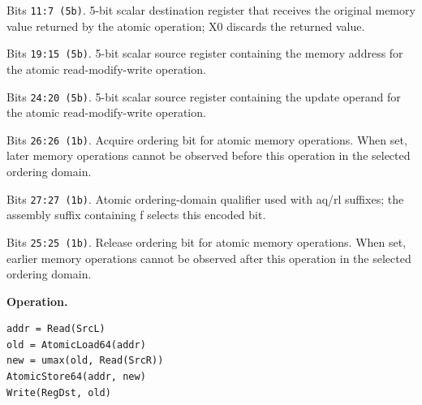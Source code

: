 \begin{description}[leftmargin=0.18\linewidth,style=nextline]
\item[\texttt{RegDst}] Bits \texttt{11:7 (5b)}. 5-bit scalar destination register that receives the original memory value returned by the atomic operation; X0 discards the returned value.
\item[\texttt{SrcL}] Bits \texttt{19:15 (5b)}. 5-bit scalar source register containing the memory address for the atomic read-modify-write operation.
\item[\texttt{SrcR}] Bits \texttt{24:20 (5b)}. 5-bit scalar source register containing the update operand for the atomic read-modify-write operation.
\item[\texttt{aq}] Bits \texttt{26:26 (1b)}. Acquire ordering bit for atomic memory operations. When set, later memory operations cannot be observed before this operation in the selected ordering domain.
\item[\texttt{far}] Bits \texttt{27:27 (1b)}. Atomic ordering-domain qualifier used with aq/rl suffixes; the assembly suffix containing f selects this encoded bit.
\item[\texttt{rl}] Bits \texttt{25:25 (1b)}. Release ordering bit for atomic memory operations. When set, earlier memory operations cannot be observed after this operation in the selected ordering domain.
\end{description}
\noindent\textbf{Operation.}\par
\begin{lstlisting}[style=ptoscalarcode]
addr = Read(SrcL)
old = AtomicLoad64(addr)
new = umax(old, Read(SrcR))
AtomicStore64(addr, new)
Write(RegDst, old)
\end{lstlisting}
\Needspace{0.08\textheight}
